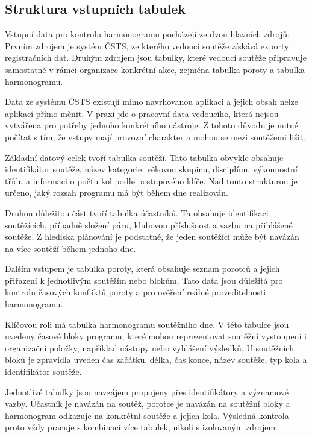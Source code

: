 \documentclass[czech, kiv, ba, he, iso690alph, pdf]{fasthesis}
\begin{document}
			\subsection{Struktura vstupních tabulek}
	
				Vstupní data pro kontrolu harmonogramu pocházejí ze dvou hlavních zdrojů. Prvním zdrojem je systém ČSTS, ze kterého vedoucí soutěže získává exporty registračních dat. Druhým zdrojem jsou tabulky, které vedoucí soutěže připravuje samostatně v rámci organizace konkrétní akce, zejména tabulka poroty a tabulka harmonogramu.
	
				Data ze systému ČSTS existují mimo navrhovanou aplikaci a jejich obsah nelze aplikací přímo měnit. V praxi jde o pracovní data vedoucího, která nejsou vytvářena pro potřeby jednoho konkrétního nástroje. Z tohoto důvodu je nutné počítat s tím, že vstupy mají provozní charakter a mohou se mezi soutěžemi lišit.
	
				Základní datový celek tvoří tabulka soutěží. Tato tabulka obvykle obsahuje identifikátor soutěže, název kategorie, věkovou skupinu, disciplínu, výkonnostní třídu a informaci o počtu kol podle postupového klíče. Nad touto strukturou je určeno, jaký rozsah programu má být během dne realizován.
	
				Druhou důležitou část tvoří tabulka účastníků. Ta obsahuje identifikaci soutěžících, případně složení páru, klubovou příslušnost a vazbu na přihlášené soutěže. Z hlediska plánování je podstatné, že jeden soutěžící může být navázán na více soutěží během jednoho dne.
	
				Dalším vstupem je tabulka poroty, která obsahuje seznam porotců a jejich přiřazení k jednotlivým soutěžím nebo blokům. Tato data jsou důležitá pro kontrolu časových konfliktů poroty a pro ověření reálné proveditelnosti harmonogramu.
	
				Klíčovou roli má tabulka harmonogramu soutěžního dne. V této tabulce jsou uvedeny časové bloky programu, které mohou reprezentovat soutěžní vystoupení i organizační položky, například nástupy nebo vyhlášení výsledků. U soutěžních bloků je zpravidla uveden čas začátku, délka, čas konce, název soutěže, typ kola a identifikátor soutěže.
	
				Jednotlivé tabulky jsou navzájem propojeny přes identifikátory a významové vazby. Účastník je navázán na soutěž, porotce je navázán na soutěžní bloky a harmonogram odkazuje na konkrétní soutěže a jejich kola. Výsledná kontrola proto vždy pracuje s kombinací více tabulek, nikoli s izolovaným zdrojem.
	
\end{document}
